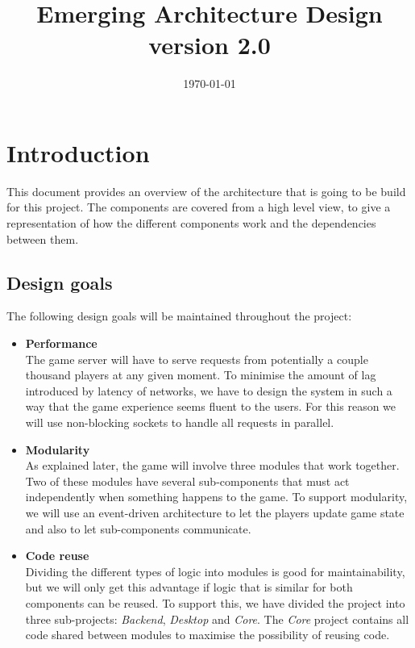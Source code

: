 \documentclass[11pt,a4paper]{article}
\begin{document}
\setlength{\droptitle}{-5em}
\title{
Emerging Architecture Design\\ 
version 2.0
}
\date{\today}
\maketitle

\section{Introduction}
This document provides an overview of the architecture that is going to be build for this project. The components are covered from a high level view, to give a representation of how the different components work and the dependencies between them.

\subsection{Design goals}
The following design goals will be maintained throughout the project:
\begin{itemize}
\item
\textbf{Performance}\\
The game server will have to serve requests from  potentially a couple thousand players at any given moment. To minimise the amount of lag introduced by latency of networks, we have to design the system in such a way that the game experience seems fluent to the users. For this reason we will use non-blocking sockets to handle all requests in parallel.

\item
\textbf{Modularity} \\
As explained later, the game will involve three modules that work together. Two of these modules have several sub-components that must act independently when something happens to the game. To support modularity, we will use an event-driven architecture to let the players update game state and also to let sub-components communicate.

\item
\textbf{Code reuse}\\
Dividing the different types of logic into modules is good for maintainability, but we will only get this advantage if logic that is similar for both components can be reused. To support this, we have divided the project into three sub-projects: \emph{Backend}, \emph{Desktop} and \emph{Core}. The \emph{Core} project contains all code shared between modules to maximise the possibility of reusing code.

\end{itemize}
\end{document}
